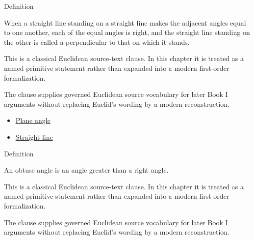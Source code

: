 \begin{definitionbox}{Definition}
\begin{definition}
\label{def:euclid-right-angle-and-perpendicular}
When a straight line standing on a straight line makes the adjacent angles equal
to one another, each of the equal angles is right, and the straight line
standing on the other is called a perpendicular to that on which it stands.
\end{definition}
\end{definitionbox}
\begin{remark*}
This is a classical Euclidean source-text clause. In this chapter it is treated
as a named primitive statement rather than expanded into a modern first-order
formalization.
\end{remark*}

\begin{remark*}[Interpretation]
The clause supplies governed Euclidean source vocabulary for later Book I
arguments without replacing Euclid's wording by a modern reconstruction.
\end{remark*}

\begin{lra-not-visible}
\begin{dependencies}
\begin{itemize}
  \item \hyperref[def:euclid-plane-angle]{Plane angle}
  \item \hyperref[def:euclid-straight-line]{Straight line}
\end{itemize}
\end{dependencies}
\end{lra-not-visible}

\begin{definitionbox}{Definition}
\begin{definition}
\label{def:euclid-obtuse-angle}
An obtuse angle is an angle greater than a right angle.
\end{definition}
\end{definitionbox}
\begin{remark*}
This is a classical Euclidean source-text clause. In this chapter it is treated
as a named primitive statement rather than expanded into a modern first-order
formalization.
\end{remark*}

\begin{remark*}[Interpretation]
The clause supplies governed Euclidean source vocabulary for later Book I
arguments without replacing Euclid's wording by a modern reconstruction.
\end{remark*}

